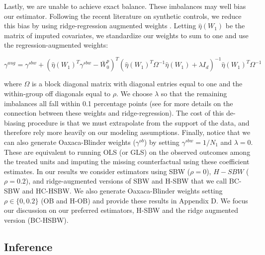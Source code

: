 \documentclass[12pt]{article}
\begin{document}
Lastly, we are unable to achieve exact balance. These imbalances may well bias our estimator. Following the recent literature on synthetic controls, we reduce this bias by using ridge-regression augmented weights \cite{ben2018augmented}. Letting $\hat{\eta}(W_1)$ be the matrix of imputed covariates, we standardize our weights to sum to one and use the regression-augmented weights:

$$
\gamma^{aug} = \gamma^{sbw} + (\hat{\eta}(W_1)^T\gamma^{sbw} - \bar{W}_0^p)^T(\hat{\eta}(W_1)^T\Omega^{-1}\hat{\eta}(W_1) + \lambda I_d)^{-1}\hat{\eta}(W_1)^T\Omega^{-1}
$$

where $\Omega$ is a block diagonal matrix with diagonal entries equal to one and the within-group off diagonals equal to $\rho$. We choose $\lambda$ so that the remaining imbalances all fall within 0.1 percentage points (see \cite{ben2018augmented} for more details on the connection between these weights and ridge-regression). The cost of this de-biasing procedure is that we must extrapolate from the support of the data, and therefore rely more heavily on our modeling assumptions. Finally, notice that we can also generate Oaxaca-Blinder weights ($\gamma^{ob}$) by setting $\gamma^{sbw} = 1/N_1$ and $\lambda = 0$. These are equivalent to running OLS (or GLS) on the observed outcomes among the treated units and imputing the missing counterfactual using these coefficient estimates. In our results we consider estimators using SBW ($\rho = 0$), $H-SBW$ ($\rho = 0.2$), and ridge-augmented versions of SBW and H-SBW that we call BC-SBW and HC-HSBW. We also generate Oaxaca-Blinder weights setting $\rho \in \{0, 0.2\}$ (OB and H-OB) and provide these results in Appendix D. We focus our discussion on our preferred estimators, H-SBW and the ridge augmented version (BC-HSBW).

\subsection{Inference}
\end{document}
